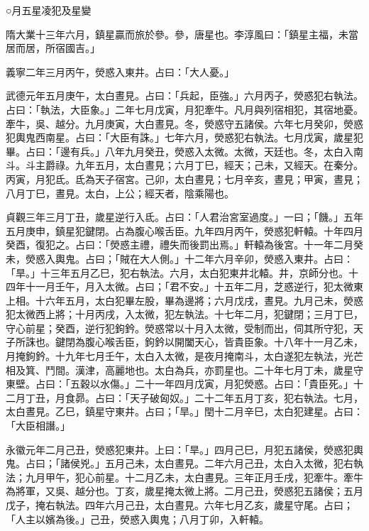 
\begin{pinyinscope}

 ○月五星凌犯及星變



 隋大業十三年六月，鎮星贏而旅於參。參，唐星也。李淳風曰：「鎮星主福，未當居而居，所宿國吉。」



 義寧二年三月丙午，熒惑入東井。占曰：「大人憂。」



 武德元年五月庚午，太白晝見。占曰：「兵起，臣強。」六月丙子，熒惑犯右執法。占曰：「執法，大臣象。」二年七月戊寅，月犯牽牛。凡月與列宿相犯，其宿地憂。牽牛，吳、越分。九月庚寅，大白晝見。冬，熒惑守五諸侯。六年七月癸卯，熒惑犯輿鬼西南星。占曰：「大臣有誅。」七年六月，熒惑犯右執法。七月戊寅，歲星犯畢。占曰：「邊有兵。」八年九月癸丑，熒惑入太微。太微，天廷也。冬，太白入南斗。斗主爵祿。九年五月，太白晝見；六月丁巳，經天；己未，又經天。在秦分。丙寅，月犯氐。氐為天子宿宮。己卯，太白晝見；七月辛亥，晝見；甲寅，晝見；八月丁巳，晝見。太白，上公；經天者，陰乘陽也。



 貞觀三年三月丁丑，歲星逆行入氐。占曰：「人君治宮室過度。」一曰；「饑。」五年五月庚申，鎮星犯鍵閉。占為腹心喉舌臣。九年四月丙午，熒惑犯軒轅。十年四月癸酉，復犯之。占曰：「熒惑主禮，禮失而後罰出焉。」軒轅為後宮。十一年二月癸未，熒惑入輿鬼。占曰；「賊在大人側。」十二年六月辛卯，熒惑入東井。占曰：「旱。」十三年五月乙巳，犯右執法。六月，太白犯東井北轅。井，京師分也。十四年十一月壬午，月入太微。占曰；「君不安。」十五年二月，芝惑逆行，犯太微東上相。十六年五月，太白犯畢左股，畢為邊將；六月戊戌，晝見。九月己未，熒惑犯太微西上將；十月丙戌，入太微，犯左執法。十七年二月，犯鍵閉；三月丁巳，守心前星；癸酉，逆行犯鉤鈐。熒惑常以十月入太微，受制而出，伺其所守犯，天子所誅也。鍵閉為腹心喉舌臣，鉤鈐以開闔天心，皆貴臣象。十八年十一月乙未，月掩鉤鈐。十九年七月壬午，太白入太微，是夜月掩南斗，太白遂犯左執法，光芒相及箕、鬥間。漢津，高麗地也。太白為兵，亦罰星也。二十年七月丁未，歲星守東壁。占曰：「五穀以水傷。」二十一年四月戊寅，月犯熒惑。占曰：「貴臣死。」十二月丁丑，月食昴。占曰：「天子破匈奴。」二十二年五月丁亥，犯右執法。七月，太白晝見。乙巳，鎮星守東井。占曰；「旱。」閏十二月辛巳，太白犯建星。占曰：「大臣相譖。」



 永徽元年二月己丑，熒惑犯東井。上曰：「旱。」四月己巳，月犯五諸侯，熒惑犯輿鬼。占曰；「諸侯兇。」五月己未，太白晝見。二年六月己丑，太白入太微，犯右執法；九月甲午，犯心前星。十二月乙未，太白晝見。三年正月壬戌，犯牽牛。牽牛為將軍，又吳、越分也。丁亥，歲星掩太微上將。二月己丑，熒惑犯五諸侯；五月戊子，掩右執法。四年六月己丑，太白晝見。六年七月乙亥，歲星守尾。占曰；「人主以嬪為後。」己丑，熒惑入輿鬼；八月丁卯，入軒轅。




\end{pinyinscope}
